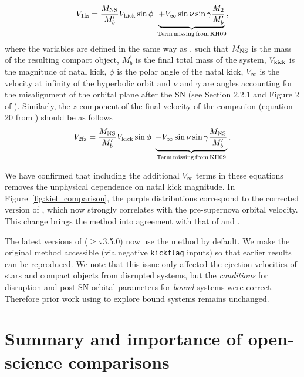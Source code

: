 \documentclass[apj,twocolumn]{openjournal}
\begin{document}
\begin{equation}
    V_{\rm 1fz} = \frac{M_{\rm NS}}{M_b^{\prime}} V_{\rm kick} \sin \phi \ \underbrace{ + V_{\infty} \sin \nu \sin \gamma \frac{M_2}{M_b^\prime}}_{\rm Term \, missing \, from \, KH09},
\end{equation}
where the variables are defined in the same way as , such that $M_{\rm NS}$ is the mass of the resulting compact object, $M_b^\prime$ is the final total mass of the system, $V_{\rm kick}$ is the magnitude of natal kick, $\phi$ is the polar angle of the natal kick, $V_\infty$ is the velocity at infinity of the hyperbolic orbit and $\nu$ and $\gamma$ are angles accounting for the misalignment of the orbital plane after the SN (see Section 2.2.1 and Figure 2 of ). Similarly, the $z$-component of the final velocity of the companion (equation 20 from ) should be as follows
\begin{equation}
    V_{\rm 2fz} = \frac{M_{\rm NS}}{M_b^{\prime}} V_{\rm kick} \sin \phi \ \underbrace{- V_{\infty} \sin \nu \sin \gamma \frac{M_{\rm NS}}{M_b^\prime}}_{\rm Term \, missing \, from \, KH09}.
\end{equation}

We have confirmed that including the additional $V_\infty$ terms in these equations removes the unphysical dependence on natal kick magnitude. In Figure~\ref{fig:kiel_comparison}, the purple distributions correspond to the corrected version of , which now strongly correlates with the pre-supernova orbital velocity. This change brings the  method into agreement with that of \citet{pfahl_comprehensive_2002} and \citet{Tauris+1998:1998AA...330.1047T}.

The latest versions of \cosmic ($\ge$v3.5.0) now use the \citet{pfahl_comprehensive_2002} method by default. We make the original \citet{Kiel+2009:2009MNRAS.395.2326K} method accessible (via negative \texttt{kickflag} inputs) so that earlier \cosmic results can be reproduced. We note that this issue only affected the ejection velocities of stars and compact objects from disrupted systems, but the \textit{conditions} for disruption and post-SN orbital parameters for \textit{bound} systems were correct. Therefore prior work using \cosmic to explore bound systems remains unchanged.

\section{Summary and importance of open-science comparisons}
\end{document}
